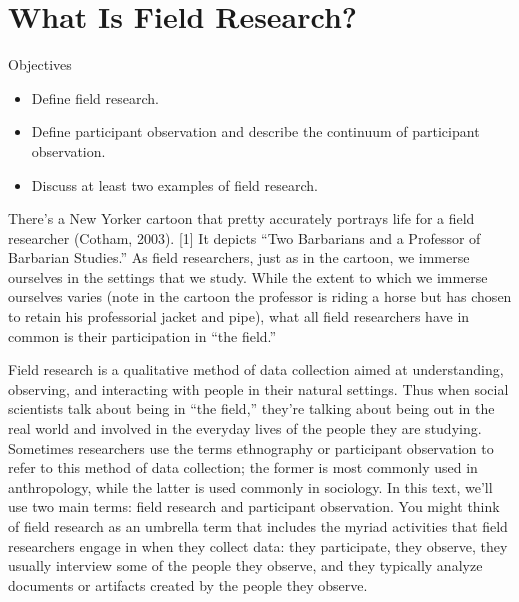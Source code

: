 \section{What Is Field Research?}
\begin{center}
	\begin{objbox}{Objectives}
		\begin{itemize}
			\setlength{\itemsep}{0pt}
			\setlength{\parskip}{0pt}
			\setlength{\parsep}{0pt}
			
			\item Define field research.
			\item Define participant observation and describe the continuum of participant observation.
			\item Discuss at least two examples of field research.			

		\end{itemize}
	\end{objbox}
\end{center}

There’s a New Yorker cartoon that pretty accurately portrays life for a field researcher (Cotham, 2003). [1] It depicts “Two Barbarians and a Professor of Barbarian Studies.” As field researchers, just as in the cartoon, we immerse ourselves in the settings that we study. While the extent to which we immerse ourselves varies (note in the cartoon the professor is riding a horse but has chosen to retain his professorial jacket and pipe), what all field researchers have in common is their participation in “the field.”

Field research is a qualitative method of data collection aimed at understanding, observing, and interacting with people in their natural settings. Thus when social scientists talk about being in “the field,” they’re talking about being out in the real world and involved in the everyday lives of the people they are studying. Sometimes researchers use the terms ethnography or participant observation to refer to this method of data collection; the former is most commonly used in anthropology, while the latter is used commonly in sociology. In this text, we’ll use two main terms: field research and participant observation. You might think of field research as an umbrella term that includes the myriad activities that field researchers engage in when they collect data: they participate, they observe, they usually interview some of the people they observe, and they typically analyze documents or artifacts created by the people they observe.

